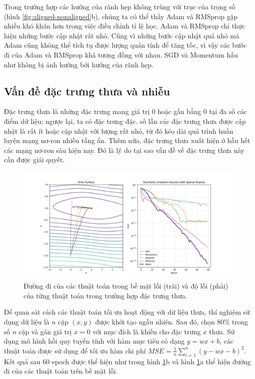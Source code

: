 Trong trường hợp các hướng của rãnh hẹp không trùng với trục của trọng số (hình \ref{fig:aligned-nonaligned}b), chúng ta có thể thấy Adam và RMSprop gặp nhiều khó khăn hơn trong việc điều chỉnh tỉ lệ học. Adam và RMSprop chỉ thực hiện những bước cập nhật rất nhỏ. Cũng vì những bước cập nhật quá nhỏ mà Adam cũng không thể tích tụ được lượng quán tính để tăng tốc, vì vậy các bước đi của Adam và RMSprop khá tương đồng với nhau. SGD và Momentum hầu như không bị ảnh hưởng bởi hướng của rãnh hẹp.

\subsection{Vấn đề đặc trưng thưa và nhiễu}

Đặc trưng thưa là những đặc trưng mang giá trị 0 hoặc gần bằng 0 tại đa số các điểm dữ liệu; ngược lại, ta có đặc trưng đặc. số lần các đặc trưng thưa được cập nhật là rất ít hoặc cập nhật với lượng rất nhỏ, từ đó kéo dài quá trình huấn luyện mạng nơ-ron nhiều tầng ẩn. Thêm nữa, đặc trưng thưa xuất hiện ở hầu hết các mạng nơ-ron sâu hiện nay. Đó là lý do tại sao vấn đề về đặc trưng thưa này cần được giải quyết.

\begin{figure}[htp]
	\centering
	\includegraphics[width=140 mm]{images/sparse.png}
	\caption{Đường đi của các thuật toán trong bề mặt lỗi (trái) và độ lỗi (phải) của từng thuật toán trong trường hợp đặc trưng thưa.}
	\label{fig:sparse}
\end{figure}

Để quan sát cách các thuật toán tối ưu hoạt động với dữ liệu thưa, thí nghiệm sử dụng dữ liệu là $n$ cặp $(x,y)$ được khởi tạo ngẫu nhiên. Sau đó, chọn 80$\%$ trong số $n$ cặp và gán giá trị $x = 0$ với mục đích là khiến cho đặc trưng $x$ thưa. Sử dụng mô hình hồi quy tuyến tính với hàm mục tiêu có dạng $y = wx + b$, các thuật toán được sử dụng để tối ưu hàm chi phí $MSE = \frac{1}{n}\sum_{i=1}^n(y - wx - b)^2$. Kết quả sau 60 epoch được thể hiện như trong hình \ref{fig:sparse}b và hình \ref{fig:sparse}a thể hiện đường đi của các thuật toán trên bề mặt lỗi.

